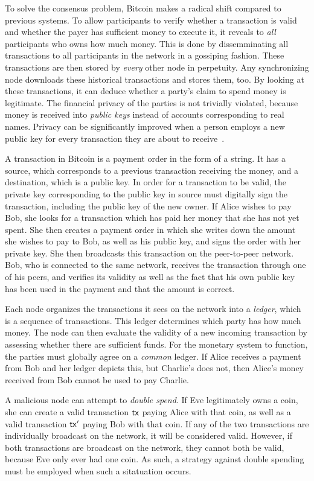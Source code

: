To solve the consensus problem, Bitcoin makes a radical shift compared to
previous systems. To allow participants to verify whether a transaction is valid
and whether the payer has sufficient money to execute it, it reveals to
\emph{all}
participants who owns how much money. This is done by dissemminating all
transactions to all participants in the network in a gossiping fashion. These
transactions are then stored by \emph{every} other node in perpetuity. Any
synchronizing node downloads these historical transactions and stores them, too.
By looking at these transactions, it can deduce whether a party's claim to spend
money is legitimate. The financial privacy of the parties is not trivially
violated, because money is received into \emph{public keys} instead of accounts
corresponding to real names. Privacy can be significantly improved when a person
employs a new public key for every transaction they are about to
receive~\cite{bitcoin-dev-guide}.

A transaction in Bitcoin is a payment order in the form of a string. It has a
source, which corresponds to a previous transaction receiving the money, and a
destination, which is a public key. In order for a transaction to be valid, the
private key corresponding to the public key in source must digitally sign the
transaction, including the public key of the new owner. If Alice wishes to pay
Bob, she looks for a transaction which has paid her money that she has not yet
spent. She then creates a payment order in which she writes down the amount she
wishes to pay to Bob, as well as his public key, and signs the order with her
private key. She then broadcasts this transaction on the peer-to-peer network.
Bob, who is connected to the same network, receives the transaction through one
of his peers, and verifies its validity as well as the fact that his own public
key has been used in the payment and that the amount is correct.

Each node organizes the transactions it sees on the network into a
\emph{ledger}, which is a sequence of transactions. This ledger determines which
party has how much money. The node can then evaluate the validity of a new
incoming transaction by assessing whether there are sufficient funds. For the
monetary system to function, the parties must globally agree on a \emph{common}
ledger. If Alice receives a payment from Bob and her ledger depicts this, but
Charlie's does not, then Alice's money received from Bob cannot be used to pay
Charlie.

A malicious node can attempt to \emph{double spend}. If Eve legitimately owns a
coin, she can create a valid transaction $\mathsf{tx}$ paying Alice with that coin, as
well as a valid transaction $\mathsf{tx}'$ paying Bob with that coin. If any of the two
transactions are individually broadcast on the network, it will be considered
valid. However, if both transactions are broadcast on the network, they cannot
both be valid, because Eve only ever had one coin. As such, a strategy against
double spending must be employed when such a sitatuation occurs.


